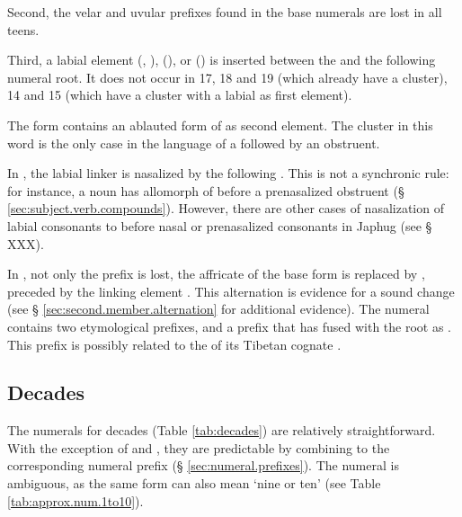 Second, the velar  and uvular  prefixes found in the base numerals are lost in all teens.

Third, a labial element  (, ),  (), or  () is inserted between the  and the following numeral root. It does not occur in 17, 18 and 19 (which already have a cluster), 14 and 15 (which have a cluster with a labial as first element).

The form  contains an ablauted form of  as second element. The cluster  in this word is the only case in the language of a  followed by an obstruent. 

In , the labial linker is nasalized by the following . This is not a synchronic rule: for instance, a noun  has  allomorph of  before a prenasalized obstruent (§ \ref{sec:subject.verb.compounds}). However, there are other cases of nasalization of labial consonants to  before nasal or prenasalized consonants in Japhug (see § XXX).

In , not only the prefix  is lost, the  affricate of the base form 	 is replaced by , preceded by the linking element . This  \tld{}  alternation is evidence for a sound change  \fl{}  (see § \ref{sec:second.member.alternation} for additional evidence).  The numeral  contains two etymological prefixes,  and a prefix  that has fused with the root as . This  prefix is possibly related to the  of its Tibetan cognate   .


\subsection{Decades} \label{sec:decades}
The numerals for decades (Table \ref{tab:decades}) are relatively straightforward. With the exception of  and , they are predictable by combining  to the corresponding numeral prefix (§ \ref{sec:numeral.prefixes}). The numeral  is ambiguous, as the same form can also mean `nine or ten' (see Table \ref{tab:approx.num.1to10}).

